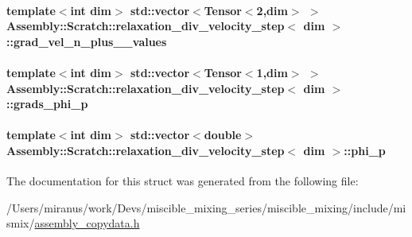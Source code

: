 \paragraph[{grad\+\_\+vel\+\_\+n\+\_\+plus\+\_\+1\+\_\+values}]{\setlength{\rightskip}{0pt plus 5cm}template$<$int dim$>$ std\+::vector$<$Tensor$<$2,dim$>$ $>$ {\bf Assembly\+::\+Scratch\+::relaxation\+\_\+div\+\_\+velocity\+\_\+step}$<$ dim $>$\+::grad\+\_\+vel\+\_\+n\+\_\+plus\+\_\+\_\+values}\label{struct_assembly_1_1_scratch_1_1relaxation__div__velocity__step_a8eb65ba7135f100ceadb24a86d5d32ae}
\hypertarget{struct_assembly_1_1_scratch_1_1relaxation__div__velocity__step_a9fae0fc0a91b6c248c1f19bc7907a8cd}{}
\paragraph[{grads\+\_\+phi\+\_\+p}]{\setlength{\rightskip}{0pt plus 5cm}template$<$int dim$>$ std\+::vector$<$Tensor$<$1,dim$>$ $>$ {\bf Assembly\+::\+Scratch\+::relaxation\+\_\+div\+\_\+velocity\+\_\+step}$<$ dim $>$\+::grads\+\_\+phi\+\_\+p}\label{struct_assembly_1_1_scratch_1_1relaxation__div__velocity__step_a9fae0fc0a91b6c248c1f19bc7907a8cd}
\hypertarget{struct_assembly_1_1_scratch_1_1relaxation__div__velocity__step_a62319566acffdbef4ff0b505bae37b01}{}
\paragraph[{phi\+\_\+p}]{\setlength{\rightskip}{0pt plus 5cm}template$<$int dim$>$ std\+::vector$<$double$>$ {\bf Assembly\+::\+Scratch\+::relaxation\+\_\+div\+\_\+velocity\+\_\+step}$<$ dim $>$\+::phi\+\_\+p}\label{struct_assembly_1_1_scratch_1_1relaxation__div__velocity__step_a62319566acffdbef4ff0b505bae37b01}


The documentation for this struct was generated from the following file\+:\begin{DoxyCompactItemize}
\item 
/\+Users/miranus/work/\+Devs/miscible\+\_\+mixing\+\_\+series/miscible\+\_\+mixing/include/mismix/\hyperlink{assembly__copydata_8h}{assembly\+\_\+copydata.\+h}\end{DoxyCompactItemize}

